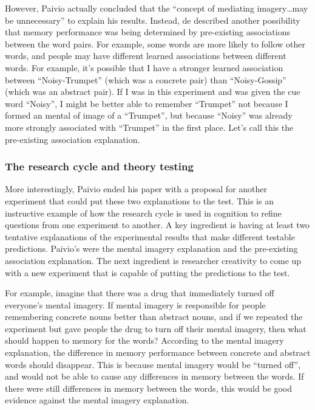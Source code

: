 \documentclass[
  oneside,
  12pt]{crumpbook}
\begin{document}
However, Paivio actually concluded that the ``concept of mediating imagery\ldots may be unnecessary'' to explain his results. Instead, de described another possibility that memory performance was being determined by pre-existing associations between the word pairs. For example, some words are more likely to follow other words, and people may have different learned associations between different words. For example, it's possible that I have a stronger learned association between ``Noisy-Trumpet'' (which was a concrete pair) than ``Noisy-Gossip'' (which was an abstract pair). If I was in this experiment and was given the cue word ``Noisy'', I might be better able to remember ``Trumpet'' not because I formed an mental of image of a ``Trumpet'', but because ``Noisy'' was already more strongly associated with ``Trumpet'' in the first place. Let's call this the pre-existing association explanation.

\hypertarget{the-research-cycle-and-theory-testing}{%
\subsubsection{The research cycle and theory testing}\label{the-research-cycle-and-theory-testing}}

More interestingly, Paivio ended his paper with a proposal for another experiment that could put these two explanations to the test. This is an instructive example of how the research cycle is used in cognition to refine questions from one experiment to another. A key ingredient is having at least two tentative explanations of the experimental results that make different testable predictions. Paivio's were the mental imagery explanation and the pre-existing association explanation. The next ingredient is researcher creativity to come up with a new experiment that is capable of putting the predictions to the test.

For example, imagine that there was a drug that immediately turned off everyone's mental imagery. If mental imagery is responsible for people remembering concrete nouns better than abstract nouns, and if we repeated the experiment but gave people the drug to turn off their mental imagery, then what should happen to memory for the words? According to the mental imagery explanation, the difference in memory performance between concrete and abstract words should disappear. This is because mental imagery would be ``turned off'', and would not be able to cause any differences in memory between the words. If there were still differences in memory between the words, this would be good evidence against the mental imagery explanation.
\end{document}
